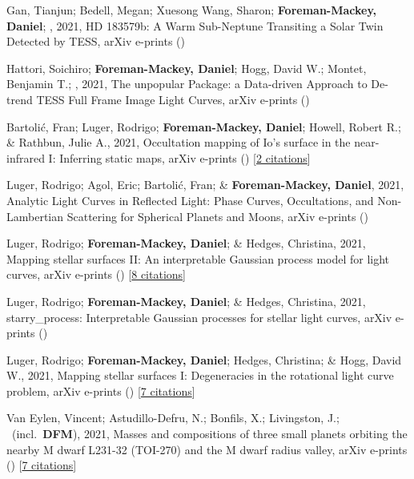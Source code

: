 \item[{\color{numcolor}\scriptsize13}] Gan, Tianjun; Bedell, Megan; Xuesong Wang, Sharon; \textbf{Foreman-Mackey, Daniel}; \etal, 2021, HD 183579b: A Warm Sub-Neptune Transiting a Solar Twin Detected by TESS, arXiv e-prints ()

\item[{\color{numcolor}\scriptsize12}] Hattori, Soichiro; \textbf{Foreman-Mackey, Daniel}; Hogg, David W.; Montet, Benjamin T.; \etal, 2021, The unpopular Package: a Data-driven Approach to De-trend TESS Full Frame Image Light Curves, arXiv e-prints ()

\item[{\color{numcolor}\scriptsize11}] Bartoli{\'c}, Fran; Luger, Rodrigo; \textbf{Foreman-Mackey, Daniel}; Howell, Robert R.; \& Rathbun, Julie A., 2021, Occultation mapping of Io's surface in the near-infrared I: Inferring static maps, arXiv e-prints () [\href{https://ui.adsabs.harvard.edu/abs/2021arXiv210303758B}{2 citations}]

\item[{\color{numcolor}\scriptsize10}] Luger, Rodrigo; Agol, Eric; Bartoli{\'c}, Fran; \& \textbf{Foreman-Mackey, Daniel}, 2021, Analytic Light Curves in Reflected Light: Phase Curves, Occultations, and Non-Lambertian Scattering for Spherical Planets and Moons, arXiv e-prints ()

\item[{\color{numcolor}\scriptsize9}] Luger, Rodrigo; \textbf{Foreman-Mackey, Daniel}; \& Hedges, Christina, 2021, Mapping stellar surfaces II: An interpretable Gaussian process model for light curves, arXiv e-prints () [\href{https://ui.adsabs.harvard.edu/abs/2021arXiv210201697L}{8 citations}]

\item[{\color{numcolor}\scriptsize8}] Luger, Rodrigo; \textbf{Foreman-Mackey, Daniel}; \& Hedges, Christina, 2021, starry{\_}process: Interpretable Gaussian processes for stellar light curves, arXiv e-prints ()

\item[{\color{numcolor}\scriptsize7}] Luger, Rodrigo; \textbf{Foreman-Mackey, Daniel}; Hedges, Christina; \& Hogg, David W., 2021, Mapping stellar surfaces I: Degeneracies in the rotational light curve problem, arXiv e-prints () [\href{https://ui.adsabs.harvard.edu/abs/2021arXiv210200007L}{7 citations}]

\item[{\color{numcolor}\scriptsize6}] Van Eylen, Vincent; Astudillo-Defru, N.; Bonfils, X.; Livingston, J.; \etal\ (incl.\ \textbf{DFM}), 2021, Masses and compositions of three small planets orbiting the nearby M dwarf L231-32 (TOI-270) and the M dwarf radius valley, arXiv e-prints () [\href{https://ui.adsabs.harvard.edu/abs/2021arXiv210101593V}{7 citations}]

